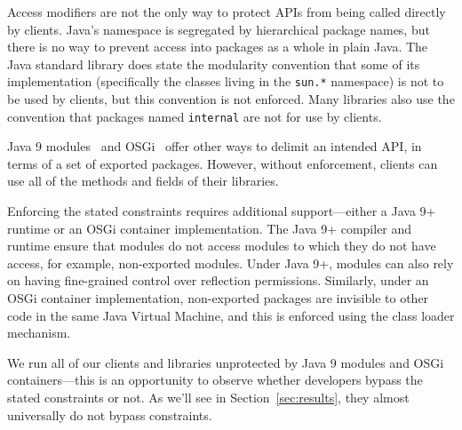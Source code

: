 
Access modifiers are not the only way to protect APIs from being
called directly by clients.  Java's namespace is segregated by
hierarchical package names, but there is no way to prevent access into packages as a whole in plain Java. 
The Java standard library does state the modularity convention
that some of its implementation (specifically the classes living in
the \texttt{sun.*} namespace) is not to be used by clients, but this
convention is not enforced. Many libraries also use the convention that packages
named \texttt{internal} are not for use by clients. 

Java 
9 modules~\cite{corporation17:_java_platf_modul_system_jsr} and OSGi~\cite{alliance20:_osgi_core_releas_specif} offer other ways to delimit an intended API, in terms of a set of exported
packages. However, without enforcement, clients can use
all of the methods and fields of their libraries.

Enforcing the stated constraints requires additional support---either
a Java 9+ runtime or an OSGi container implementation. The Java 9+
compiler and runtime ensure that modules do not access modules to
which they do not have access, for example, non-exported modules. Under Java
9+, modules can also rely on having fine-grained control over
reflection permissions. Similarly, under an OSGi container implementation,
non-exported packages are invisible to other code in the same Java
Virtual Machine, and this is enforced using the class loader
mechanism. 

We run all of our clients and libraries unprotected by Java 9 modules
and OSGi containers---this is an opportunity to observe whether developers
bypass the stated constraints or not. As we'll see in Section~\ref{sec:results}, 
they almost universally do not bypass constraints.





